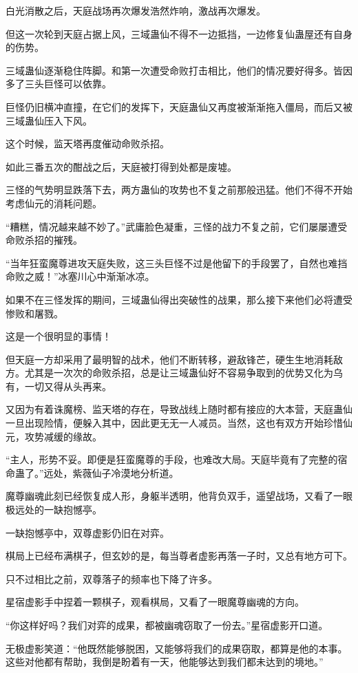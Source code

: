 \begin{this_body}
白光消散之后，天庭战场再次爆发浩然炸响，激战再次爆发。

但这一次轮到天庭占据上风，三域蛊仙不得不一边抵挡，一边修复仙蛊屋还有自身的伤势。

三域蛊仙逐渐稳住阵脚。和第一次遭受命败打击相比，他们的情况要好得多。皆因多了三头巨怪可以依靠。

巨怪仍旧横冲直撞，在它们的发挥下，天庭蛊仙又再度被渐渐拖入僵局，而后又被三域蛊仙压入下风。

这个时候，监天塔再度催动命败杀招。

如此三番五次的酣战之后，天庭被打得到处都是废墟。

三怪的气势明显跌落下去，两方蛊仙的攻势也不复之前那般迅猛。他们不得不开始考虑仙元的消耗问题。

“糟糕，情况越来越不妙了。”武庸脸色凝重，三怪的战力不复之前，它们屡屡遭受命败杀招的摧残。

“当年狂蛮魔尊进攻天庭失败，这三头巨怪不过是他留下的手段罢了，自然也难挡命败之威！”冰塞川心中渐渐冰凉。

如果不在三怪发挥的期间，三域蛊仙得出突破性的战果，那么接下来他们必将遭受惨败和屠戮。

这是一个很明显的事情！

但天庭一方却采用了最明智的战术，他们不断转移，避敌锋芒，硬生生地消耗敌方。尤其是一次次的命败杀招，总是让三域蛊仙好不容易争取到的优势又化为乌有，一切又得从头再来。

又因为有着诛魔榜、监天塔的存在，导致战线上随时都有接应的大本营，天庭蛊仙一旦出现险情，便躲入其中，因此更无无一人减员。当然，这也有双方开始珍惜仙元，攻势减缓的缘故。

“主人，形势不妥。即便是狂蛮魔尊的手段，也难改大局。天庭毕竟有了完整的宿命蛊了。”远处，紫薇仙子冷漠地分析道。

魔尊幽魂此刻已经恢复成人形，身躯半透明，他背负双手，遥望战场，又看了一眼极远处的一缺抱憾亭。

一缺抱憾亭中，双尊虚影仍旧在对弈。

棋局上已经布满棋子，但玄妙的是，每当尊者虚影再落一子时，又总有地方可下。

只不过相比之前，双尊落子的频率也下降了许多。

星宿虚影手中捏着一颗棋子，观看棋局，又看了一眼魔尊幽魂的方向。

“你这样好吗？我们对弈的成果，都被幽魂窃取了一份去。”星宿虚影开口道。

无极虚影笑道：“他既然能够脱困，又能够将我们的成果窃取，都算是他的本事。这些对他都有帮助，我倒是盼着有一天，他能够达到我们都未达到的境地。”


\end{this_body}
